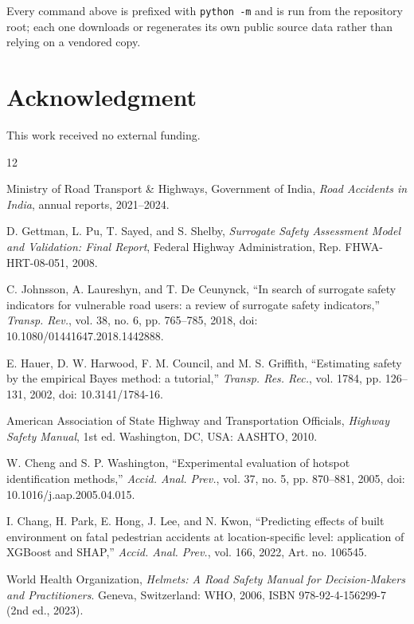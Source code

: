 \documentclass[journal]{IEEEtran}
\begin{document}
Every command above is prefixed with \texttt{python -m} and is run from the repository root; each one downloads or regenerates its own public source data rather than relying on a vendored copy.

\section*{Acknowledgment}
This work received no external funding.

\begin{thebibliography}{12}

 Ministry of Road Transport \& Highways, Government of India, \emph{Road Accidents in India}, annual reports, 2021--2024.

 D. Gettman, L. Pu, T. Sayed, and S. Shelby, \emph{Surrogate Safety Assessment Model and Validation: Final Report}, Federal Highway Administration, Rep. FHWA-HRT-08-051, 2008.

 C. Johnsson, A. Laureshyn, and T. De Ceunynck, ``In search of surrogate safety indicators for vulnerable road users: a review of surrogate safety indicators,'' \emph{Transp. Rev.}, vol. 38, no. 6, pp. 765--785, 2018, doi: 10.1080/01441647.2018.1442888.

 E. Hauer, D. W. Harwood, F. M. Council, and M. S. Griffith, ``Estimating safety by the empirical Bayes method: a tutorial,'' \emph{Transp. Res. Rec.}, vol. 1784, pp. 126--131, 2002, doi: 10.3141/1784-16.

 American Association of State Highway and Transportation Officials, \emph{Highway Safety Manual}, 1st ed. Washington, DC, USA: AASHTO, 2010.

 W. Cheng and S. P. Washington, ``Experimental evaluation of hotspot identification methods,'' \emph{Accid. Anal. Prev.}, vol. 37, no. 5, pp. 870--881, 2005, doi: 10.1016/j.aap.2005.04.015.

 I. Chang, H. Park, E. Hong, J. Lee, and N. Kwon, ``Predicting effects of built environment on fatal pedestrian accidents at location-specific level: application of XGBoost and SHAP,'' \emph{Accid. Anal. Prev.}, vol. 166, 2022, Art. no. 106545.

 World Health Organization, \emph{Helmets: A Road Safety Manual for Decision-Makers and Practitioners}. Geneva, Switzerland: WHO, 2006, ISBN 978-92-4-156299-7 (2nd ed., 2023).


\end{thebibliography}
\end{document}
